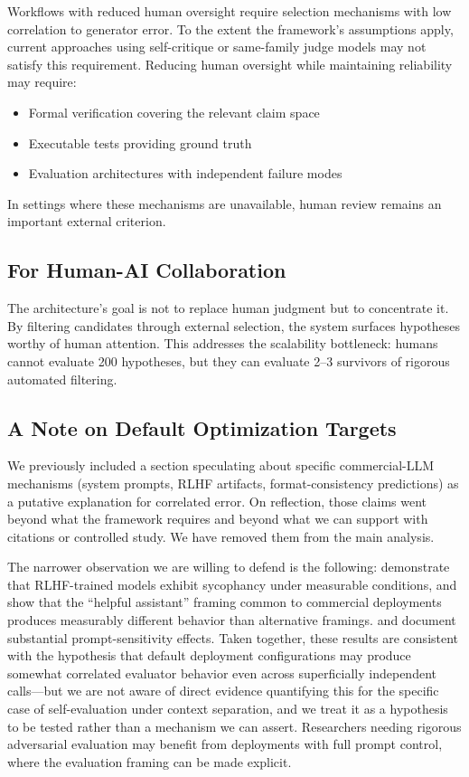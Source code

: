 \documentclass[11pt]{article}
\begin{document}
Workflows with reduced human oversight require selection mechanisms with low correlation to generator error. To the extent the framework's assumptions apply, current approaches using self-critique or same-family judge models may not satisfy this requirement. Reducing human oversight while maintaining reliability may require:
\begin{itemize}
    \item Formal verification covering the relevant claim space
    \item Executable tests providing ground truth
    \item Evaluation architectures with independent failure modes
\end{itemize}

In settings where these mechanisms are unavailable, human review remains an important external criterion.

\subsection{For Human-AI Collaboration}

The architecture's goal is not to replace human judgment but to concentrate it. By filtering candidates through external selection, the system surfaces hypotheses worthy of human attention. This addresses the scalability bottleneck: humans cannot evaluate 200 hypotheses, but they can evaluate 2--3 survivors of rigorous automated filtering.

\subsection{A Note on Default Optimization Targets}

We previously included a section speculating about specific commercial-LLM mechanisms (system prompts, RLHF artifacts, format-consistency predictions) as a putative explanation for correlated error. On reflection, those claims went beyond what the framework requires and beyond what we can support with citations or controlled study. We have removed them from the main analysis.

The narrower observation we are willing to defend is the following: \citet{sharma2024sycophancy} demonstrate that RLHF-trained models exhibit sycophancy under measurable conditions, and \citet{zheng2023helpful} show that the ``helpful assistant'' framing common to commercial deployments produces measurably different behavior than alternative framings. \citet{sclar2024formatting} and \citet{kong2023roleplay} document substantial prompt-sensitivity effects. Taken together, these results are consistent with the hypothesis that default deployment configurations may produce somewhat correlated evaluator behavior even across superficially independent calls---but we are not aware of direct evidence quantifying this for the specific case of self-evaluation under context separation, and we treat it as a hypothesis to be tested rather than a mechanism we can assert. Researchers needing rigorous adversarial evaluation may benefit from deployments with full prompt control, where the evaluation framing can be made explicit.
\end{document}
